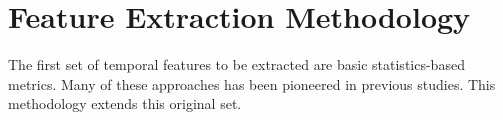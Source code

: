 \section{Feature Extraction Methodology}
\label{sec:featureextraction}

The first set of temporal features to be extracted are basic statistics-based metrics. Many of these approaches has been pioneered in previous studies. This methodology extends this original set.

